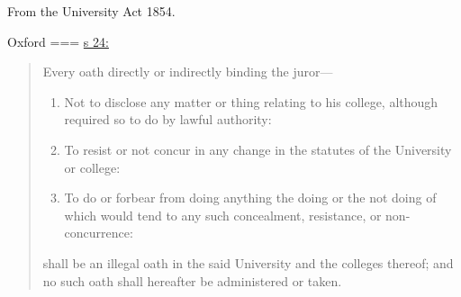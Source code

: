 From the University Act 1854.

Oxford
===
\href{https://www.legislation.gov.uk/ukpga/Vict/17-18/81/section/24}{s 24:}
\begin{quote}
Every oath directly or indirectly binding the juror—
\begin{enumerate}[label=]
    \item Not to disclose any matter or thing relating to his college, although required so to do by lawful authority:
    \item To resist or not concur in any change in the statutes of the University or college:
    \item To do or forbear from doing anything the doing or the not doing of which would tend to any such concealment, resistance, or non-concurrence: 
\end{enumerate}
shall be an illegal oath in the said University and the colleges thereof; and no such oath shall hereafter be administered or taken. 
\end{quote}